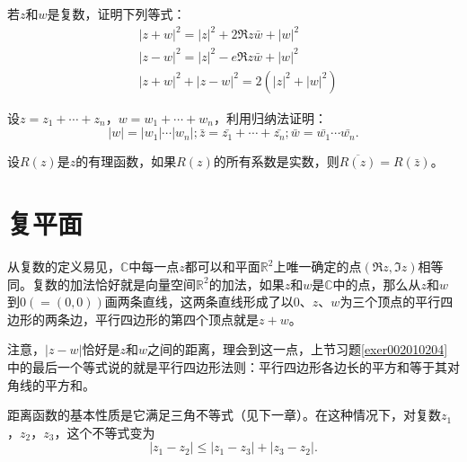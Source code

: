 \begin{exercise}\label{exer002010204}
若$z$和$w$是复数，证明下列等式：
\[
\begin{aligned}
&|z+w|^2 = |z|^2 + 2\Re{z\bar{w}} + |w|^2 \\
&|z-w|^2 = |z|^2 - e\Re{z\bar{w}} + |w|^2 \\
&|z+w|^2 + |z-w|^2 = 2(|z|^2+|w|^2)
\end{aligned}
\]
\end{exercise}

\begin{exercise}
设$z=z_1+\cdots+z_n$，$w= w_1+\cdots+w_n$，利用归纳法证明：
\[
|w| = |w_1|\cdots|w_n|; \bar{z}=\bar{z_1}+\cdots+\bar{z_n}; \bar{w}=\bar{w_1}\cdots\bar{w_n}.
\]
\end{exercise}

\begin{exercise}
设$R(z)$是$z$的有理函数，如果$R(z)$的所有系数是实数，则$\overline{R(z)} = R(\bar{z})$。
\end{exercise}

\section{复平面}\label{subsection0020103}
从复数的定义易见，$\mathbb{C}$中每一点$z$都可以和平面$\mathbb{R}^2$上唯一确定的点$(\Re{z}, \Im{z})$相等同。复数的加法恰好就是向量空间$\mathbb{R}^2$的加法，如果$z$和$w$是$\mathbb{C}$中的点，那么从$z$和$w$到$0(=(0,0))$画两条直线，这两条直线形成了以$0$、$z$、$w$为三个顶点的平行四边形的两条边，平行四边形的第四个顶点就是$z+w$。

注意，$|z-w|$恰好是$z$和$w$之间的距离，理会到这一点，上节习题\ref{exer002010204}中的最后一个等式说的就是平行四边形法则：平行四边形各边长的平方和等于其对角线的平方和。

距离函数的基本性质是它满足三角不等式（见下一章）。在这种情况下，对复数$z_1$，$z_2$，$z_3$，这个不等式变为
\[
|z_1-z_2| \le |z_1-z_3| + |z_3-z_2|.
\]

